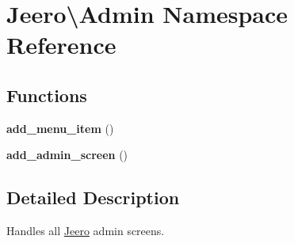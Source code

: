 \hypertarget{namespaceJeero_1_1Admin}{}\section{Jeero\textbackslash{}Admin Namespace Reference}
\label{namespaceJeero_1_1Admin}
\subsection*{Functions}
\begin{DoxyCompactItemize}
\item 
\mbox{\label{namespaceJeero_1_1Admin_ab3431ee74882551b0d3e0c4b35848b7a}} 
{\bfseries add\+\_\+menu\+\_\+item} ()
\item 
\mbox{\label{namespaceJeero_1_1Admin_aa3fc419a7f4ccf70acc767fde777b635}} 
{\bfseries add\+\_\+admin\+\_\+screen} ()
\end{DoxyCompactItemize}


\subsection{Detailed Description}
Handles all \hyperlink{namespaceJeero}{Jeero} admin screens. 